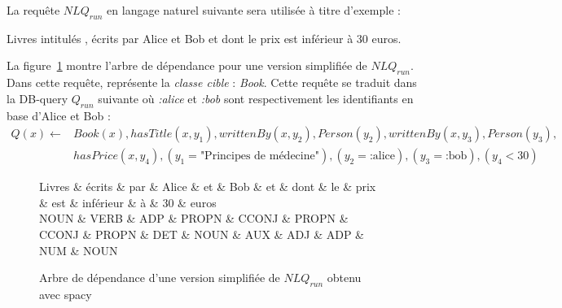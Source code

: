 \begin{example}
    La requête $NLQ_{run}$ en langage naturel suivante sera utilisée à titre d'exemple :
    \begin{displayquote}
        Livres intitulés , écrits par Alice et Bob et dont le prix est inférieur à 30 euros.
    \end{displayquote}

    La figure~\ref{fig:nl-query:dep} montre l'arbre de dépendance pour une version simplifiée de $NLQ_{run}$.
    Dans cette requête,  représente la \emph{classe cible} : \emph{Book}.
    Cette requête se traduit dans la DB-query $Q_{run}$ suivante où \emph{:alice} et \emph{:bob} sont respectivement les identifiants en base d'Alice et Bob :
    \begin{equation*}
        \begin{split}
            Q(x) \leftarrow & Book(x), hasTitle(x, y_1), writtenBy(x, y_2), Person(y_2), writtenBy(x, y_3), Person(y_3),                      \\
                            & hasPrice(x, y_4), (y_1 = \text{"Principes de médecine"}), (y_2= \text{:alice}), (y_3 = \text{:bob}), (y_4 < 30)
        \end{split}
    \end{equation*}
\end{example}

\begin{figure}[htb]
    \tiny
    \centering
    \begin{adjustbox}{width=\linewidth}
        \begin{dependency}[theme=simple, edge horizontal padding=5ex, edge unit distance=1em, column sep=2em]
            \begin{deptext}
                Livres \& écrits \& par \& Alice \& et \& Bob \& et \& dont \& le \& prix \& est \& inférieur \& à \& 30 \& euros \\
                NOUN \& VERB \& ADP \& PROPN \& CCONJ \& PROPN \& CCONJ \& PROPN \& DET \& NOUN \& AUX \& ADJ \& ADP \& NUM \& NOUN \\
            \end{deptext}

        \end{dependency}
    \end{adjustbox}
    \caption[Arbre de dépendance d'une version simplifiée de $NLQ_{run}$]{Arbre de dépendance d'une version simplifiée de $NLQ_{run}$ obtenu avec \gls{spacy}}
    \label{fig:nl-query:dep}
\end{figure}

